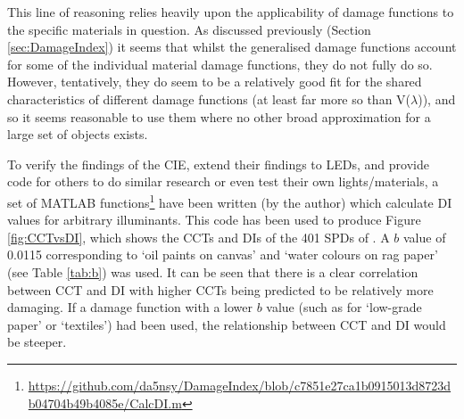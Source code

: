 This line of reasoning relies heavily upon the applicability of damage functions to the specific materials in question. As discussed previously (Section \ref{sec:DamageIndex}) it seems that whilst the generalised damage functions account for some of the individual material damage functions, they do not fully do so. However, tentatively, they do seem to be a relatively good fit for the shared characteristics of different damage functions (at least far more so than V($\lambda$)), and so it seems reasonable to use them where no other broad approximation for a large set of objects exists.

To verify the findings of the \gls{CIE}, extend their findings to \glspl{LED}, and provide code for others to do similar research or even test their own lights/materials, a set of MATLAB functions\footnote{\url{https://github.com/da5nsy/DamageIndex/blob/c7851e27ca1b0915013d8723db04704b49b4085e/CalcDI.m}} have been written (by the author) which calculate \gls{DI} values for arbitrary illuminants. This code has been used to produce Figure \ref{fig:CCTvsDI}, which shows the \glspl{CCT} and \glspl{DI} of the 401 \glspl{SPD} of \citet{houser_review_2013}. A $b$ value of 0.0115 corresponding to `oil paints on canvas' and `water colours on rag paper' (see Table \ref{tab:b}) was used. It can be seen that there is a clear correlation between \gls{CCT} and \gls{DI} with higher \glspl{CCT} being predicted to be relatively more damaging. If a damage function with a lower $b$ value (such as for `low-grade paper' or `textiles') had been used, the relationship between \gls{CCT} and \gls{DI} would be steeper.

%

\begin{fullpagefigure}
\figpageside{}
\caption{The \glspl{CCT} and \glspl{DI} of the \glspl{SPD} used by \citet{houser_review_2013} (provided via personal communication, but now partially (without category information) available via \gls{PTB} as `spd\_houser').}
\label{fig:CCTvsDI}
\end{fullpagefigure}

